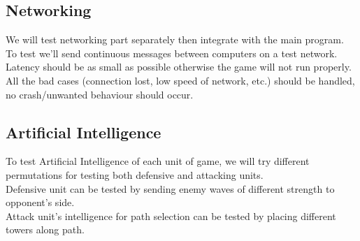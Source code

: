 \documentclass{article}
\begin{document}
\subsection{Networking}
We will test networking part separately then integrate with the main program. To test we'll send continuous messages between computers on a test network. Latency should be as small as possible otherwise the game will not run properly.\\
All the bad cases (connection lost, low speed of network, etc.) should be handled, no crash/unwanted behaviour should occur.
\subsection{Artificial Intelligence}
To test Artificial Intelligence of each unit of game, we will try different permutations for testing both defensive and attacking units.\\
Defensive unit can be tested by sending enemy waves of different strength to opponent's side. \\
Attack unit's intelligence for path selection can be tested by placing different towers along path.
\end{document}
